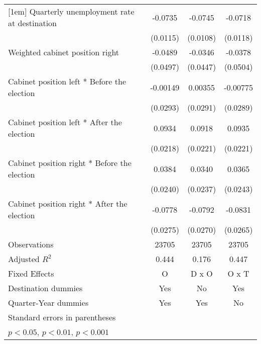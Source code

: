 \begin{table}[htbp]
\begin{tabular}{l*{3}{c}}
[1em]
Quarterly unemployment rate at destination&     -0.0735\sym{***}&     -0.0745\sym{***}&     -0.0718\sym{***}\\
                    &    (0.0115)         &    (0.0108)         &    (0.0118)         \\
[1em]
Weighted cabinet position right&     -0.0489         &     -0.0346         &     -0.0378         \\
                    &    (0.0497)         &    (0.0447)         &    (0.0504)         \\
[1em]
Cabinet position left * Before the election&    -0.00149         &     0.00355         &    -0.00775         \\
                    &    (0.0293)         &    (0.0291)         &    (0.0289)         \\
[1em]
Cabinet position left * After the election&      0.0934\sym{***}&      0.0918\sym{***}&      0.0935\sym{***}\\
                    &    (0.0218)         &    (0.0221)         &    (0.0221)         \\
[1em]
Cabinet position right * Before the election&      0.0384         &      0.0340         &      0.0365         \\
                    &    (0.0240)         &    (0.0237)         &    (0.0243)         \\
[1em]
Cabinet position right * After the election&     -0.0778\sym{**} &     -0.0792\sym{**} &     -0.0831\sym{**} \\
                    &    (0.0275)         &    (0.0270)         &    (0.0265)         \\
\hline
Observations        &       23705         &       23705         &       23705         \\
Adjusted \(R^{2}\)  &       0.444         &       0.176         &       0.447         \\
Fixed Effects       &           O         &       D x O         &       O x T         \\
Destination dummies &         Yes         &          No         &         Yes         \\
Quarter-Year dummies&         Yes         &         Yes         &          No         \\
\hline\hline
\multicolumn{4}{l}{\footnotesize Standard errors in parentheses}\\
\multicolumn{4}{l}{\footnotesize \sym{*} \(p<0.05\), \sym{**} \(p<0.01\), \sym{***} \(p<0.001\)}\\
\end{tabular}
\end{table}
